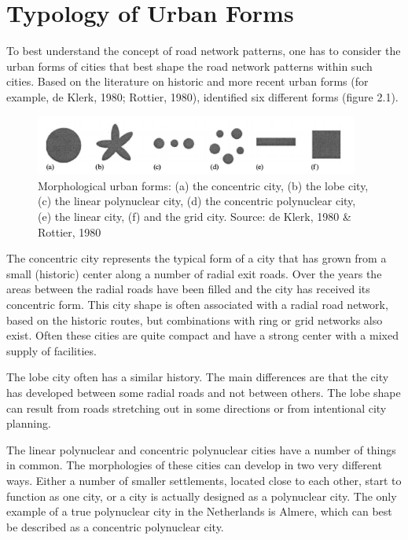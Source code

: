 
\section{Typology of Urban Forms}
To best understand the concept of road network patterns, one has to consider the urban forms of cities that best shape the road network patterns within such cities. Based on the literature on historic and more recent urban forms (for example, de Klerk, 1980; Rottier, 1980), identified six different forms (figure 2.1).
\begin{figure}[h]
\centering
\includegraphics[width=0.95\textwidth,center]{picture/figure1.png}
\caption[Miniaturtrichter]{Morphological urban forms: (a) the concentric city, (b) the lobe city, (c) the linear polynuclear city, (d) the concentric polynuclear city, (e) the linear city, (f) and the grid city.  Source: de Klerk, 1980 \& Rottier, 1980}
\label{fig:urban forms}
\end{figure}

The concentric city represents the typical form of a city that has grown from a small (historic) center along a number of radial exit roads. Over the years the areas between the radial roads have been filled and the city has received its concentric form. This city shape is often associated with a radial road network, based on the historic routes, but combinations with ring or grid networks also exist. Often these cities are quite compact and have a strong center with a mixed supply of facilities.

The lobe city often has a similar history. The main differences are that the city has developed between some radial roads and not between others. The lobe shape can result from roads stretching out in some directions or from intentional city planning.

The linear polynuclear and concentric polynuclear cities have a number of things in common. The morphologies of these cities can develop in two very different ways. Either a number of smaller settlements, located close to each other, start to function as one city, or a city is actually designed as a polynuclear city. The only example of a true polynuclear city in the Netherlands is Almere, which can best be described as a concentric polynuclear city. 

